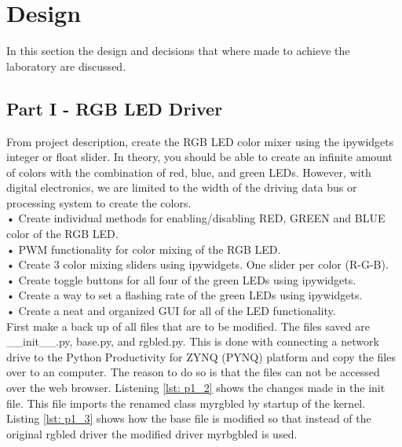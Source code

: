 \section{Design}\label{sec: Design}
In this section the design and decisions that where made to achieve the laboratory are discussed.

\subsection{Part I - RGB LED Driver}\label{subsec: Jupyter Notebook}
From project description, create the RGB LED color mixer using the ipywidgets integer or float slider. In theory, you should be able to create an infinite amount of colors with the combination of red, blue, and green LEDs. However,
with digital electronics, we are limited to the width of the driving data bus or processing system to create the colors. \\

• Create individual methods for enabling/disabling RED, GREEN and BLUE color of the RGB LED.\\

• PWM functionality for color mixing of the RGB LED.\\

• Create 3 color mixing sliders using ipywidgets. One slider per color (R-G-B).\\

• Create toggle buttons for all four of the green LEDs using ipywidgets.\\

• Create a way to set a flashing rate of the green LEDs using ipywidgets.\\

• Create a neat and organized GUI for all of the LED functionality. \\

First make a back up of all files that are to be modified. The files saved are \_\_init\_\_.py, base.py, and rgbled.py. This is done with connecting a network drive to the Python Productivity for ZYNQ (PYNQ) platform and copy the files over to an computer. The reason to do so is that the files can not be accessed over the web browser. Listening \ref{lst: p1_2} shows the changes made in the init file. This file imports the renamed class myrgbled by startup of the kernel. Listing \ref{lst: p1_3} shows how the base file is modified so that instead of the original rgbled driver the modified driver myrbgbled is used.

